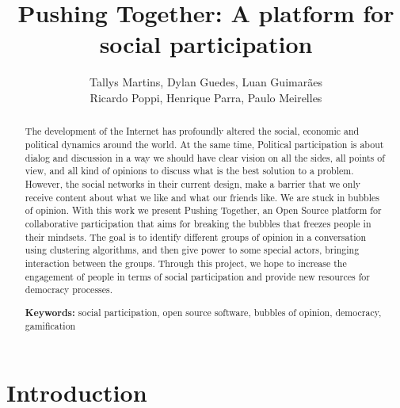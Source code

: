 \documentclass{llncs}
\begin{document}
\sloppy
\title{Pushing Together: A platform for social participation}

\author{Tallys Martins, Dylan Guedes, Luan Guimarães\\
        Ricardo Poppi, Henrique Parra, Paulo Meirelles}



\maketitle
\begin{abstract}

The development of the Internet has profoundly altered the social, economic
and political dynamics around the world. At the same time, Political
participation is about dialog and discussion in a way we should have clear
vision on all the sides, all points of view, and all kind of opinions to
discuss what is the best solution to a problem. However, the social networks
in their current design, make a barrier that we
only receive content about what we like and what our friends
like. We are stuck in bubbles of opinion.  With this work we present Pushing
Together, an Open Source platform for collaborative participation that aims for
breaking the bubbles that freezes people in their mindsets. The goal is to
identify different groups of opinion in a conversation using clustering
algorithms, and then give power to some special actors, bringing interaction
between the groups. Through this project, we hope to increase the engagement of
people in terms of social participation and provide new resources for democracy
processes.

\textbf{Keywords:} social participation, open source software, bubbles of
opinion, democracy, gamification
\end{abstract}

\section{Introduction}
\label{sec:intro}
\end{document}
